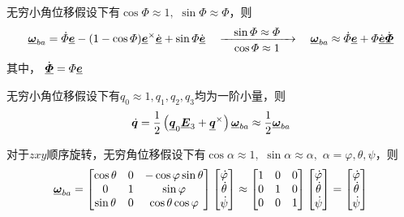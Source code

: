 \newpage

\sssection[欧拉轴 / 角]

无穷小角位移假设下有$\cos \varPhi \approx 1, \,\, \sin \varPhi \approx \varPhi$，则
\begin{equation}
	\underline{\bm{\omega}}_{ba} = \dot{\varPhi} \underline{\bm{e}} - (1 - \cos \varPhi) \underline{\bm{e}}^\times \dot{\underline{\bm{e}}} + \sin \varPhi \dot{\underline{\bm{e}}} \quad 
	\xrightarrow[\quad \textstyle \cos \varPhi \approx 1 \quad]{\quad \textstyle \sin \varPhi \approx \varPhi \quad} \quad 
	\underline{\bm{\omega}}_{ba} \approx \dot{\varPhi}\underline{\bm{e}} + \varPhi \dot{\underline{\bm{e}}} \dot{\underline{\bm{\varPhi}}}
\end{equation}
其中， $\dot{\underline{\bm{\varPhi}}} = \varPhi \underline{\bm{e}}$
\vspace*{1em}


\sssection[欧拉参数]

无穷小角位移假设下有$q_0 \approx 1, q_1, q_2, q_3$均为一阶小量，则
\begin{equation}
	\dot{\bm{q}} = \dfrac{1}{2} \left(\underline{\bm{q}}_0 \underline{\bm{E}}_3 + \underline{\bm{q}}^\times\right)\underline{\bm{\omega}}_{ba}
	\approx 
	\dfrac{1}{2} \underline{\bm{\omega}}_{ba}
\end{equation}
\vspace*{1em}


\sssection[欧拉角]

对于$zxy$顺序旋转，无穷角位移假设下有$\cos \alpha \approx 1, \,\, \sin \alpha \approx \alpha, \,\, \alpha = \varphi, \theta , \psi$，则
\begin{equation}
	\underline{\bm{\omega}}_{ba} =
	\begin{bmatrix}
		\cos \theta & 0 & - \cos \varphi \sin \theta \\
		0 & 1 & \sin \varphi \\
		\sin \theta & 0 & \cos \theta \cos \varphi
	\end{bmatrix}
	\begin{bmatrix}
		\dot{\varphi} \\
		\dot{\theta} \\
		\dot{\psi}
	\end{bmatrix}
	\approx
	\begin{bmatrix}
		1 & 0 & 0 \\
		0 & 1 & 0 \\
		0 & 0& 1
	\end{bmatrix}
	\begin{bmatrix}
		\dot{\varphi} \\
		\dot{\theta} \\
		\dot{\psi}
	\end{bmatrix}
	=
	\begin{bmatrix}
		\dot{\varphi} \\
		\dot{\theta} \\
		\dot{\psi}
	\end{bmatrix}
\end{equation}


